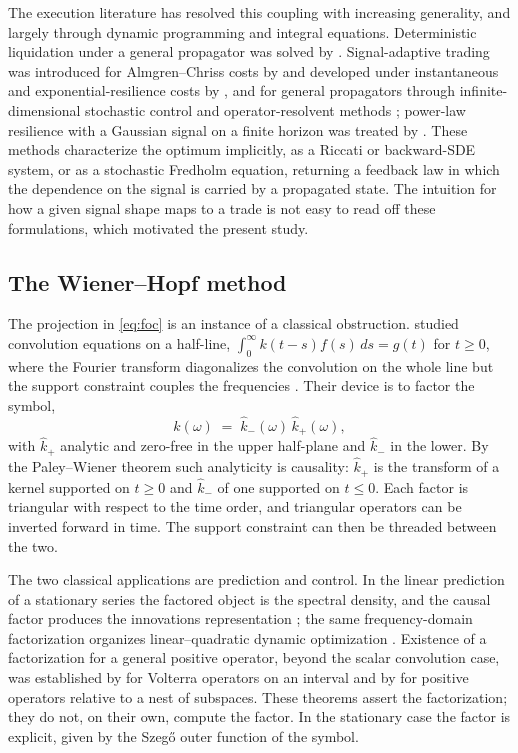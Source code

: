 \documentclass[11pt]{article}
\theoremstyle{plain}
\theoremstyle{definition}
\theoremstyle{remark}
\begin{document}
The execution literature has resolved this coupling with increasing generality, and largely through dynamic programming and integral equations. Deterministic liquidation under a general propagator was solved by \citet{GatheralSchiedSlynko2012}. Signal-adaptive trading was introduced for Almgren--Chriss costs by \citet{CarteaJaimungal2013} and developed under instantaneous and exponential-resilience costs by \citet{LehalleNeuman2019,NeumanVoss2022,BankSonerVoss2017}, and for general propagators through infinite-dimensional stochastic control and operator-resolvent methods \citep{AbiJaberNeuman2025,AbiJaberNeumanTuschmann2024,AbiJaberDeCarvalhoPham2024}; power-law resilience with a Gaussian signal on a finite horizon was treated by \citet{FordeSanchezSmith2022}. These methods characterize the optimum implicitly, as a Riccati or backward-SDE system, or as a stochastic Fredholm equation, returning a feedback law in which the dependence on the signal is carried by a propagated state. The intuition for how a given signal shape maps to a trade is not easy to read off these formulations, which motivated the present study.

\subsection{The Wiener--Hopf method}\label{sec:wh}

The projection in \eqref{eq:foc} is an instance of a classical obstruction. \citet{WienerHopf1931} studied convolution equations on a half-line, $\int_0^\infty k(t-s)f(s)\,ds=g(t)$ for $t\ge0$, where the Fourier transform diagonalizes the convolution on the whole line but the support constraint couples the frequencies \citep{Krein1962,Noble1958}. Their device is to factor the symbol,
\[
\hat k(\omega) \;=\; \hat k_-(\omega)\,\hat k_+(\omega),
\]
with $\hat k_+$ analytic and zero-free in the upper half-plane and $\hat k_-$ in the lower. By the Paley--Wiener theorem such analyticity is causality: $\hat k_+$ is the transform of a kernel supported on $t\ge0$ and $\hat k_-$ of one supported on $t\le0$. Each factor is triangular with respect to the time order, and triangular operators can be inverted forward in time. The support constraint can then be threaded between the two.

The two classical applications are prediction and control. In the linear prediction of a stationary series the factored object is the spectral density, and the causal factor produces the innovations representation \citep{Wiener1949,Whittle1963}; the same frequency-domain factorization organizes linear--quadratic dynamic optimization \citep{Whiteman1985}. Existence of a factorization for a general positive operator, beyond the scalar convolution case, was established by \citet{GohbergKrein1970} for Volterra operators on an interval and by \citet{Arveson1975} for positive operators relative to a nest of subspaces. These theorems assert the factorization; they do not, on their own, compute the factor. In the stationary case the factor is explicit, given by the Szeg\H{o} outer function of the symbol.
\end{document}
